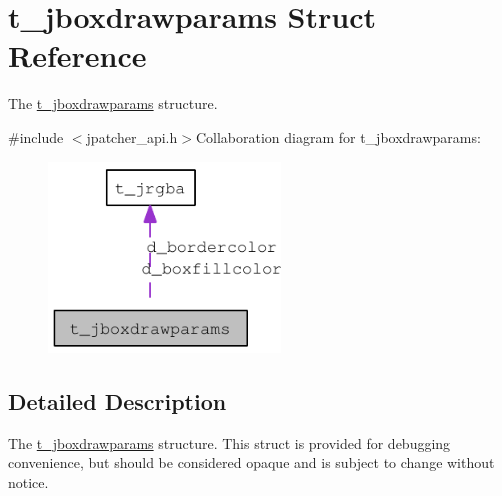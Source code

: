 \hypertarget{structt__jboxdrawparams}{
\section{t\_\-jboxdrawparams Struct Reference}
\label{structt__jboxdrawparams}
}


The \hyperlink{structt__jboxdrawparams}{t\_\-jboxdrawparams} structure.  


{\ttfamily \#include $<$jpatcher\_\-api.h$>$}Collaboration diagram for t\_\-jboxdrawparams:\nopagebreak
\begin{figure}[H]
\begin{center}
\leavevmode
\includegraphics[width=175pt]{structt__jboxdrawparams__coll__graph}
\end{center}
\end{figure}


\subsection{Detailed Description}
The \hyperlink{structt__jboxdrawparams}{t\_\-jboxdrawparams} structure. This struct is provided for debugging convenience, but should be considered opaque and is subject to change without notice. 